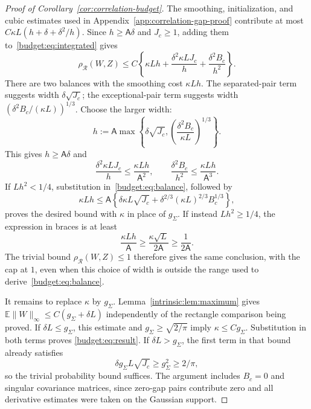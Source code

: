 \documentclass[11pt,letterpaper]{article}
\theoremstyle{remark}
\newcommand{\E}{\mathbb E}
\newcommand{\rh}{\rho_{\mathcal R}}
\begin{document}
\begin{proof}[Proof of Corollary~\ref{cor:correlation-budget}]
The smoothing, initialization, and cubic estimates used in
Appendix~\ref{app:correlation-gap-proof} contribute at most
$C\kappa L(h+\delta+\delta^2/h)$. Since $h\ge\mathsf A\delta$
and $J_c\ge1$, adding them to~\eqref{budget:eq:integrated} gives
\begin{equation}
 \rh(W,Z)\le C\left\{
       \kappa Lh+\frac{\delta^2\kappa LJ_c}{h}
                    +\frac{\delta^2B_c}{h^2}\right\}.
 \label{budget:eq:balance}
\end{equation}
There are two balances with the smoothing cost $\kappa Lh$.
The separated-pair term suggests width $\delta\sqrt{J_c}$;
the exceptional-pair term suggests width
$(\delta^2B_c/(\kappa L))^{1/3}$. Choose the larger width:
\[
 h:=\mathsf A\max\left\{\delta\sqrt{J_c},
                    \left(\frac{\delta^2B_c}{\kappa L}\right)^{1/3}
              \right\}.
\]
This gives $h\ge\mathsf A\delta$ and
\[
 \frac{\delta^2\kappa LJ_c}{h}
       \le\frac{\kappa Lh}{\mathsf A^2},\qquad
 \frac{\delta^2B_c}{h^2}
       \le\frac{\kappa Lh}{\mathsf A^3}.
\]
If $Lh^2<1/4$, substitution in~\eqref{budget:eq:balance}, followed by
\[
 \kappa Lh\le\mathsf A\left\{
       \delta\kappa L\sqrt{J_c}
       +\delta^{2/3}(\kappa L)^{2/3}B_c^{1/3}\right\},
\]
proves the desired bound with $\kappa$ in place of $g_\Sigma$.
If instead $Lh^2\ge1/4$, the expression in braces is at least
\[
 \frac{\kappa Lh}{\mathsf A}
 \ge\frac{\kappa\sqrt L}{2\mathsf A}
 \ge\frac1{2\mathsf A}.
\]
The trivial bound $\rh(W,Z)\le1$ therefore gives the same conclusion,
with the cap at $1$, even when this choice of width is outside the
range used to derive~\eqref{budget:eq:balance}.

It remains to replace $\kappa$ by $g_\Sigma$. Lemma~\ref{intrinsic:lem:maximum}
gives $\E\|W\|_\infty\le C(g_\Sigma+\delta L)$ independently of
the rectangle comparison being proved. If $\delta L\le g_\Sigma$,
this estimate and $g_\Sigma\ge\sqrt{2/\pi}$ imply
$\kappa\le Cg_\Sigma$. Substitution in both terms proves
\eqref{budget:eq:result}. If $\delta L>g_\Sigma$, the first term
in that bound already satisfies
\[
 \delta g_\Sigma L\sqrt{J_c}\ge g_\Sigma^2\ge2/\pi,
\]
so the trivial probability bound suffices. The argument includes
$B_c=0$ and singular covariance matrices, since zero-gap pairs
contribute zero and all derivative estimates were taken on the
Gaussian support.
\end{proof}
\end{document}
